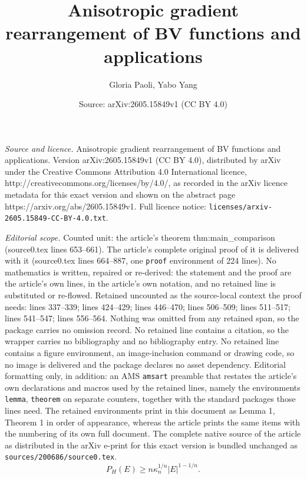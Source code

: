 \documentclass[10pt,a4paper]{amsart}
\title{Anisotropic gradient rearrangement of BV functions and applications}
\author{Gloria Paoli, Yabo Yang}
\date{Source: arXiv:2605.15849v1 (CC BY 4.0)}
\begin{document}
\maketitle

\noindent\emph{Source and licence.} Anisotropic gradient rearrangement of BV functions and applications. Version arXiv:2605.15849v1 (CC BY 4.0), distributed by arXiv under the Creative Commons Attribution 4.0 International licence, http://creativecommons.org/licenses/by/4.0/, as recorded in the arXiv licence metadata for this exact version and shown on the abstract page https://arxiv.org/abs/2605.15849v1. Full licence notice: \texttt{licenses/arxiv-2605.15849-CC-BY-4.0.txt}.\par\smallskip

\noindent\textit{Editorial scope.} Counted unit: the article's theorem thm:main\_comparison (source0.tex lines 653--661). The article's complete original proof of it is delivered with it (source0.tex lines 664--887, one \texttt{proof} environment of 224 lines). No mathematics is written, repaired or re-derived: the statement and the proof are the article's own lines, in the article's own notation, and no retained line is substituted or re-flowed.  Retained uncounted as the source-local context the proof needs: lines 337--339; lines 424--429; lines 446--470; lines 506--509; lines 511--517; lines 541--547; lines 556--564.  Nothing was omitted from any retained span, so the package carries no omission record.  No retained line contains a citation, so the wrapper carries no bibliography and no bibliography entry.  No retained line contains a figure environment, an image-inclusion command or drawing code, so no image is delivered and the package declares no asset dependency.  Editorial formatting only, in addition: an AMS \texttt{amsart} preamble that restates the article's own declarations and macros used by the retained lines, namely the environments \texttt{lemma}, \texttt{theorem} on separate counters, together with the standard packages those lines need.  The retained environments print in this document as Lemma 1, Theorem 1 in order of appearance, whereas the article prints the same items with the numbering of its own full document.  The complete native source of the article as distributed in the arXiv e-print for this exact version is bundled unchanged as \texttt{sources/200686/source0.tex}.
\begin{equation} \label{eq:isoperimetric}
    P_H(E) \geq n \kappa_n^{1/n} |E|^{1 - 1/n}.
\end{equation}
\end{document}
